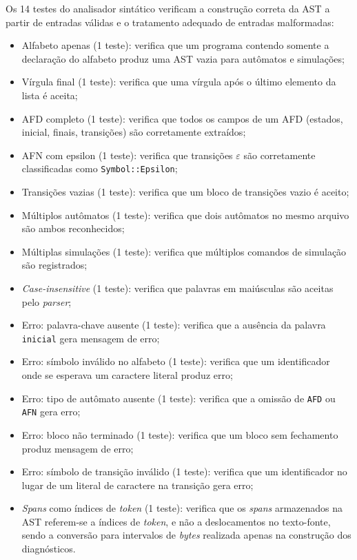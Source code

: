 \documentclass[
    12pt
    ,oneside
    ,a4paper
    ,chapter=TITLE
    ,section=TITLE
    ,sumario=abnt-6027-2012]{abntex2}
\begin{document}
Os 14 testes do analisador sintático verificam a construção correta da AST a partir de
entradas válidas e o tratamento adequado de entradas malformadas:

\begin{itemize}
    \item Alfabeto apenas (1 teste): verifica que um programa contendo somente
          a declaração do alfabeto produz uma AST vazia para autômatos e simulações;
    \item Vírgula final (1 teste): verifica que uma vírgula após o último
          elemento da lista é aceita;
    \item AFD completo (1 teste): verifica que todos os campos de um AFD
          (estados, inicial, finais, transições) são corretamente extraídos;
    \item AFN com epsilon (1 teste): verifica que transições $\varepsilon$
          são corretamente classificadas como \texttt{Symbol::Epsilon};
    \item Transições vazias (1 teste): verifica que um bloco de transições
          vazio é aceito;
    \item Múltiplos autômatos (1 teste): verifica que dois autômatos no mesmo
          arquivo são ambos reconhecidos;
    \item Múltiplas simulações (1 teste): verifica que múltiplos comandos de
          simulação são registrados;
    \item \textit{Case-insensitive} (1 teste): verifica que palavras em maiúsculas são
          aceitas pelo \textit{parser};
    \item Erro: palavra-chave ausente (1 teste): verifica que a ausência da
          palavra \texttt{inicial} gera mensagem de erro;
    \item Erro: símbolo inválido no alfabeto (1 teste): verifica que um
          identificador onde se esperava um caractere literal produz erro;
    \item Erro: tipo de autômato ausente (1 teste): verifica que a omissão de
          \texttt{AFD} ou \texttt{AFN} gera erro;
    \item Erro: bloco não terminado (1 teste): verifica que um bloco sem
          fechamento produz mensagem de erro;
    \item Erro: símbolo de transição inválido (1 teste): verifica que um
          identificador no lugar de um literal de caractere na transição gera erro;
    \item \textit{Spans} como índices de \textit{token} (1 teste): verifica que os
          \textit{spans} armazenados na AST referem-se a índices de \textit{token}, e
          não a deslocamentos no texto-fonte, sendo a conversão para intervalos de
          \textit{bytes} realizada apenas na construção dos diagnósticos.
\end{itemize}
\end{document}
